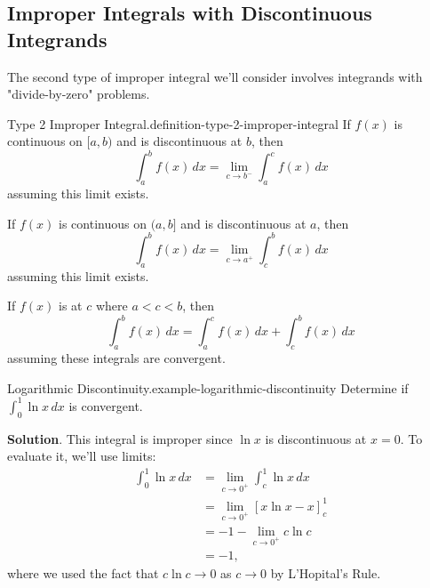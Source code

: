 \documentclass[10pt,]{book}
\numberwithin{equation}{section}
\newcommand{\lt}{<}
\begin{document}
\subsection[{Improper Integrals with Discontinuous Integrands}]{Improper Integrals with Discontinuous Integrands}\label{subsection-improper-integrals-with-discontinuous-integrands}
\hypertarget{p-594}{}%
The second type of improper integral we'll consider involves integrands with "divide-by-zero" problems.%
\begin{definition}{Type 2 Improper Integral.}{definition-type-2-improper-integral}%
\hypertarget{p-595}{}%
If \(f(x)\) is continuous on \([a,b)\) and is discontinuous at \(b\), then%
\begin{equation*}
\int_{a}^{b}f(x)\,dx = \lim_{c\to b^{-}}\int_{a}^{c}f(x)\,dx
\end{equation*}
assuming this limit exists.%
\par
\hypertarget{p-596}{}%
If \(f(x)\) is continuous on \((a,b]\) and is discontinuous at \(a\), then%
\begin{equation*}
\int_{a}^{b}f(x)\,dx = \lim_{c\to a^{+}}\int_{c}^{b}f(x)\,dx
\end{equation*}
assuming this limit exists.%
\par
\hypertarget{p-597}{}%
If \(f(x)\) is at \(c\) where \(a \lt c\lt b\), then%
\begin{equation*}
\int_{a}^{b}f(x)\,dx = \int_{a}^{c}f(x)\,dx + \int_{c}^{b}f(x)\,dx
\end{equation*}
assuming these integrals are convergent.%
\end{definition}
\begin{example}{Logarithmic Discontinuity.}{example-logarithmic-discontinuity}%
\hypertarget{p-598}{}%
Determine if \(\int_{0}^{1}\ln x\,dx\) is convergent.%
\par\smallskip%
\noindent\textbf{Solution}.\hypertarget{solution-129}{}\quad%
\hypertarget{p-599}{}%
This integral is improper since \(\ln x\) is discontinuous at \(x = 0\). To evaluate it, we'll use limits:%
\begin{align*}
\int_{0}^{1}\ln x\,dx & = \lim_{c\to0^{+}}\int_{c}^{1}\ln x\,dx \\
& = \lim_{c\to0^{+}}\left[x\ln x - x\right]_{c}^{1} \\
& = -1 - \lim_{c\to0^{+}}c\ln c \\
& = -1, 
\end{align*}
where we used the fact that \(c\ln c\to 0\) as \(c\to0\) by L'Hopital's Rule.%
\end{example}
\end{document}
